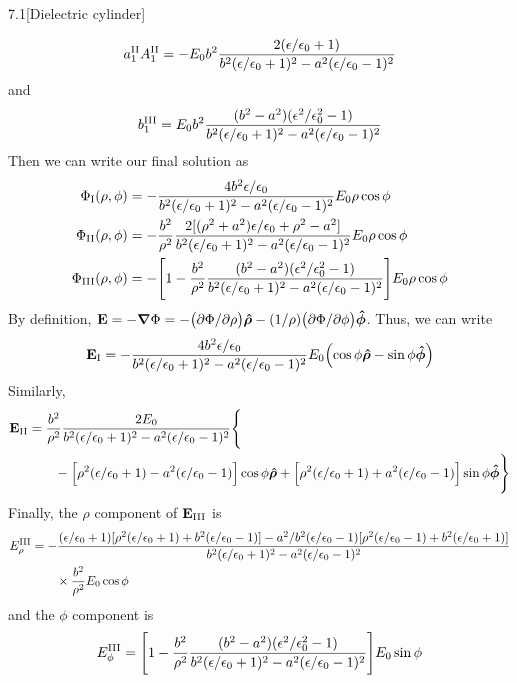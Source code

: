 \documentclass[12pt]{article}
\begin{document}
\begin{problem}{7.1}[Dielectric cylinder]
\begin{solution}
\begin{equation}
    a_1^{\RN{2}}A_1^{\RN{2}}=-E_0b^2\frac{2(\epsilon/\epsilon_0+1)}{b^2(\epsilon/\epsilon_0+1)^2-a^2(\epsilon/\epsilon_0-1)^2}
\end{equation}
and
\begin{equation}
    b_1^{\RN{3}}=E_0b^2\frac{(b^2-a^2)(\epsilon^2/\epsilon_0^2-1)}{b^2(\epsilon/\epsilon_0+1)^2-a^2(\epsilon/\epsilon_0-1)^2} 
\end{equation}
Then we can write our final solution as
\begin{subequations}
    \begin{align}
        \Phi_{\RN{1}}(\rho,\phi)
        &=-\frac{4b^2\epsilon/\epsilon_0}{b^2(\epsilon/\epsilon_0+1)^2-a^2(\epsilon/\epsilon_0-1)^2}E_0\rho\cos\phi\\
        \Phi_{\RN{2}}(\rho,\phi)
        &=-\frac{b^2}{\rho^2}\frac{2[(\rho^2+a^2)\epsilon/\epsilon_0+\rho^2-a^2]}{b^2(\epsilon/\epsilon_0+1)^2-a^2(\epsilon/\epsilon_0-1)^2}E_0\rho\cos\phi\\
        \Phi_{\RN{3}}(\rho,\phi)
        &=-\qty[1-\frac{b^2}{\rho^2}\frac{(b^2-a^2)(\epsilon^2/\epsilon_0^2-1)}{b^2(\epsilon/\epsilon_0+1)^2-a^2(\epsilon/\epsilon_0-1)^2}]E_0\rho\cos\phi
    \end{align} 
\end{subequations}
By definition, $\vb{E}=-\grad\Phi=-\qty(\partial\Phi
/\partial\rho)\bm{\hat{\rho}}-(1 /\rho)\qty(\partial\Phi /\partial\phi)\bm{\hat{\phi}}$.
Thus, we can write
\begin{equation}
    \vb{E}_{\RN{1}}=-\frac{4b^2\epsilon/\epsilon_0}{b^2(\epsilon/\epsilon_0+1)^2-a^2(\epsilon/\epsilon_0-1)^2}E_0\qty(\cos\phi\bm{\hat{\rho}}-\sin\phi\phihat)
\end{equation}
Similarly,
\begin{align}
    \vb{E}_{\RN{2}}
    &=\frac{b^2}{\rho^2}\frac{2E_0}{b^2(\epsilon/\epsilon_0+1)^2-a^2(\epsilon/\epsilon_0-1)^2}\Bigg\{\notag\\
    &\qquad-\qty[\rho^2(\epsilon/\epsilon_0+1)-a^2(\epsilon/\epsilon_0-1)]\cos\phi\bm{\hat{\rho}}+\qty[\rho^2(\epsilon/\epsilon_0+1)+a^2(\epsilon/\epsilon_0-1)]\sin\phi\phihat\Bigg\}
\end{align}
Finally, the $\rho$ component of $\vb{E}_{\RN{3}}$ is
\begin{align}
    E_{\rho}^{\RN{3}}
    &=-\frac{(\epsilon/\epsilon_0+1)[\rho^2(\epsilon/\epsilon_0+1)+b^2(\epsilon/\epsilon_0-1)]-a^2/b^2(\epsilon/\epsilon_0-1)[\rho^2(\epsilon/\epsilon_0-1)+b^2(\epsilon/\epsilon_0+1)]}{b^2(\epsilon/\epsilon_0+1)^2-a^2(\epsilon/\epsilon_0-1)^2}\notag\\
    &\qquad\times\frac{b^2}{\rho^2}E_0\cos\phi
\end{align}
and the $\phi$ component is
\begin{equation}
    E_\phi^{\RN{3}}
    =\qty[1-\frac{b^2}{\rho^2}\frac{(b^2-a^2)(\epsilon^2/\epsilon_0^2-1)}{b^2(\epsilon/\epsilon_0+1)^2-a^2(\epsilon/\epsilon_0-1)^2}]E_0\sin\phi
\end{equation}
\end{solution}
\end{problem}
\end{document}
